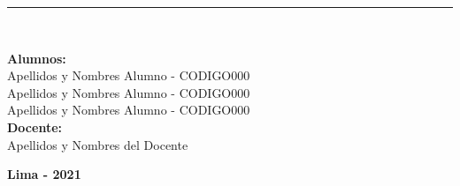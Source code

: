 \begin{titlepage}
\begin{center}
		\rule{\linewidth}{1pt}\\
		\vspace{15pt}
		
		\begin{spacing}{1.25}
			{\large \textbf{Alumnos:}}\\
			{\large
			Apellidos y Nombres Alumno - CODIGO000\\
			Apellidos y Nombres Alumno - CODIGO000\\
			Apellidos y Nombres Alumno - CODIGO000\\
			}
			\vspace{15pt}			
			{\large \textbf{Docente:}}\\
			{\large
			Apellidos y Nombres del Docente\\	
			}		
		\end{spacing}
		
		\vfill		
		{\large \textbf{Lima - 2021}}
			
	\end{center}
\end{titlepage}
